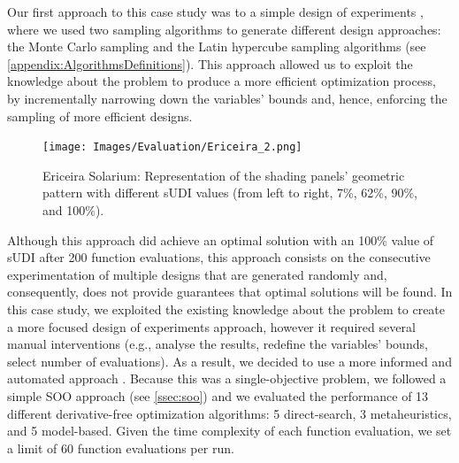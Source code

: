 Our first approach to this case study was to a simple design of experiments \cite{Caetano2018}, where we used two sampling algorithms to generate different design approaches: the Monte Carlo sampling and the Latin hypercube sampling algorithms (see \cref{appendix:AlgorithmsDefinitions}). This approach allowed us to exploit the knowledge about the problem to produce a more efficient optimization process, by incrementally narrowing down the variables' bounds and, hence, enforcing the sampling of more efficient designs. %


\begin{figure}
	\centering
	\texttt{[image: Images/Evaluation/Ericeira\_2.png]}
	\caption{Ericeira Solarium: Representation of the shading panels’ geometric pattern with different sUDI values (from left to right, 7\%, 62\%, 90\%, and 100\%).}
	\label{fig:ericeira_multiple_panels}
\end{figure}

Although this approach did achieve an optimal solution with an 100\% value of sUDI after 200 function evaluations, this approach consists on the consecutive experimentation of multiple designs that are generated randomly and, consequently, does not provide guarantees that optimal solutions will be found. In this case study, we exploited the existing knowledge about the problem to create a more focused design of experiments approach, however it required several manual interventions (e.g., analyse the results, redefine the variables' bounds, select number of evaluations). As a result, we decided to use a more informed and automated approach \cite{Belem2018optimizeddesign}. Because this was a single-objective problem, we followed a simple \ac{SOO} approach (see \cref{ssec:soo}) and we evaluated the performance of 13 different derivative-free optimization algorithms: 5 direct-search, 3 metaheuristics, and 5 model-based. Given the time complexity of each function evaluation, we set a limit of 60 function evaluations per run.

